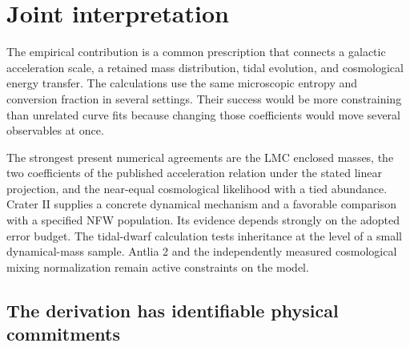 \section{Joint interpretation}

The empirical contribution is a common prescription that connects a
galactic acceleration scale, a retained mass distribution, tidal evolution,
and cosmological energy transfer. The calculations use the same
microscopic entropy and conversion fraction in several settings. Their
success would be more constraining than unrelated curve fits because
changing those coefficients would move several observables at once.

The strongest present numerical agreements are the LMC enclosed masses,
the two coefficients of the published acceleration relation under the
stated linear projection, and the near-equal cosmological likelihood
with a tied abundance. Crater II supplies a concrete dynamical mechanism
and a favorable comparison with a specified NFW population. Its evidence
depends strongly on the adopted error budget. The tidal-dwarf calculation
tests inheritance at the level of a small dynamical-mass sample. Antlia 2
and the independently measured cosmological mixing normalization remain
active constraints on the model.

\subsection{The derivation has identifiable physical commitments}

